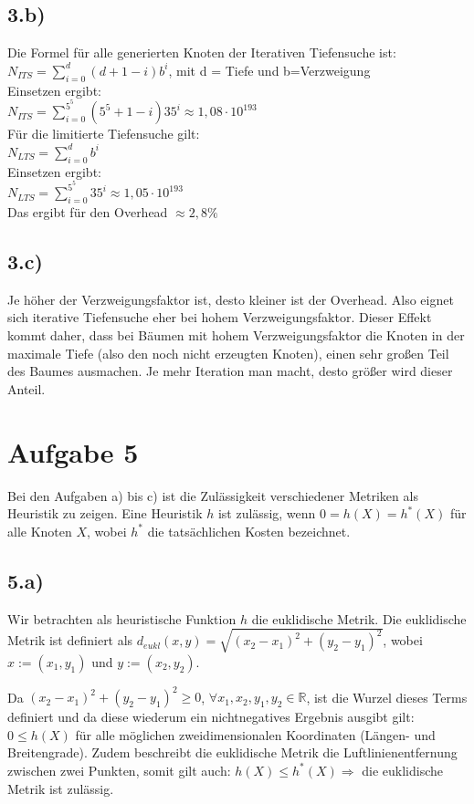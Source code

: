 \documentclass[a4paper]{article}
\newcommand{\IR}{\mathbb{R}}
\begin{document}
\subsection*{3.b)}
Die Formel für alle generierten Knoten der Iterativen Tiefensuche ist:\\
$N_{ITS}=\sum\limits_{i=0}^{d} (d+1-i)b^i$, mit d = Tiefe und b=Verzweigung\\
Einsetzen ergibt:\\
$N_{ITS}=\sum\limits_{i=0}^{5^5} (5^5+1-i)35^i \approx 1,08 \cdot 10^{193}$\\

Für die limitierte Tiefensuche gilt:\\
$N_{LTS}=\sum\limits_{i=0}^{d} b^i$\\
Einsetzen ergibt:\\
$N_{LTS}=\sum\limits_{i=0}^{5^5} 35^i \approx 1,05 \cdot 10^{193}$\\

Das ergibt für den Overhead $\approx 2,8\%$

\subsection*{3.c)}
Je höher der Verzweigungsfaktor ist, desto kleiner ist der Overhead. Also eignet sich iterative Tiefensuche eher bei hohem Verzweigungsfaktor. Dieser Effekt kommt daher, dass bei Bäumen mit hohem Verzweigungsfaktor die Knoten in der maximale Tiefe (also den noch nicht erzeugten Knoten), einen sehr großen Teil des Baumes ausmachen. Je mehr Iteration man macht, desto größer wird dieser Anteil.

\section*{Aufgabe 5}
Bei den Aufgaben a) bis c) ist die Zul\"assigkeit verschiedener Metriken als Heuristik zu zeigen. Eine Heuristik $h$ ist zul\"assig, wenn $0 = h(X) = h^\ast(X)$ f\"ur alle Knoten $X$, wobei $h^\ast$ die tats\"achlichen Kosten bezeichnet.

\subsection*{5.a)}
Wir betrachten als heuristische Funktion $h$ die euklidische Metrik. Die euklidische Metrik ist definiert als $d_{eukl}(x,y) = \sqrt{(x_2-x_1)^2+(y_2-y_1)^2} $, wobei $x:=(x_1,y_1)$ und $y:=(x_2,y_2)$. 

Da $(x_2-x_1)^2+(y_2-y_1)^2\geq0$, $\forall x_1,x_2,y_1,y_2 \in \IR$, ist die Wurzel dieses Terms definiert und da diese wiederum ein nichtnegatives Ergebnis ausgibt gilt: $0 \leq h(X)$ f\"ur alle m\"oglichen zweidimensionalen Koordinaten (L\"angen- und Breitengrade). Zudem beschreibt die euklidische Metrik die Luftlinienentfernung zwischen zwei Punkten, somit gilt auch: $h(X) \leq h^\ast(X) \Rightarrow$ die euklidische Metrik ist zul\"assig.
\end{document}
